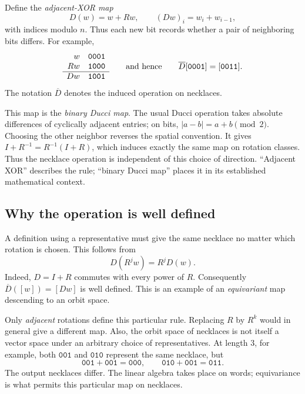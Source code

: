 \documentclass[11pt]{article}
\theoremstyle{definition}
\newcommand{\neck}[1]{[\mathtt{#1}]}
\newcommand{\word}[1]{\mathtt{#1}}
\numberwithin{equation}{section}
\begin{document}
Define the \emph{adjacent-XOR map}
\begin{equation}\label{eq:ducci}
 D(w)=w+Rw,\qquad (Dw)_i=w_i+w_{i-1},
\end{equation}
with indices modulo $n$. Thus each new bit records whether a pair of
neighboring bits differs. For example,
\[
 \begin{array}{r@{\quad}l}
 w&\word{0001}\\
 Rw&\word{1000}\\\hline
 Dw&\word{1001}
 \end{array}
 \qquad\text{and hence}\qquad
 \overline D\neck{0001}=\neck{0011}.
\]
The notation $\overline D$ denotes the induced operation on necklaces.

This map is the \emph{binary Ducci map}. The usual Ducci operation
takes absolute differences of cyclically adjacent entries; on bits,
$|a-b|=a+b\pmod2$. Choosing the other neighbor reverses the spatial
convention. It gives $I+R^{-1}=R^{-1}(I+R)$, which induces exactly the
same map on rotation classes. Thus the necklace operation is independent
of this choice of direction. ``Adjacent XOR'' describes the rule;
``binary Ducci map'' places it in its established mathematical context.

\subsection{Why the operation is well defined}

A definition using a representative must give the same necklace no
matter which rotation is chosen. This follows from
\begin{equation}\label{eq:equivariance}
 D(R^j w)=R^jD(w).
\end{equation}
Indeed, $D=I+R$ commutes with every power of $R$. Consequently
$\overline D([w])=[Dw]$ is well defined. This is an example of an
\emph{equivariant} map descending to an orbit space.

Only \emph{adjacent} rotations define this particular rule. Replacing
$R$ by $R^k$ would in general give a different map. Also, the orbit
space of necklaces is not itself a vector space under an arbitrary
choice of representatives. At length $3$, for example, both
$\word{001}$ and $\word{010}$ represent the same necklace, but
\[
 \word{001}+\word{001}=\word{000},\qquad
 \word{010}+\word{001}=\word{011}.
\]
The output necklaces differ. The linear algebra takes place on words;
equivariance is what permits this particular map on necklaces.
\end{document}
